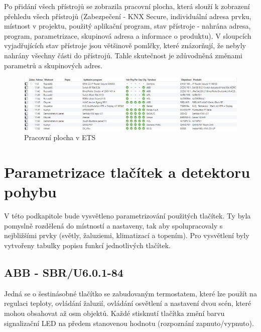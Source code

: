 Po přidání všech přístrojů se zobrazila pracovní plocha, která slouží k zobrazení přehledu všech přístrojů (Zabezpečení - KNX Secure, individuální adresa prvku, místnost v projektu, použitý aplikační program, stav přístroje - nahrána adresa, program, parametrizace, skupinová adresa a informace o produktu). V sloupcích vyjadřujících stav přístroje jsou většinově pomlčky, které znázorňují, že nebyly nahrány všechny části do přístrojů. Tahle skutečnost je zdůvodněná změnami parametrů a skupinových adres.

\begin{figure}[!ht]
  \begin{center}
    \includegraphics[scale=0.5]{obrazky/Přístroje v ETS.png}
  \end{center}
  \caption[Pracovní plocha v ETS]{Pracovní plocha v ETS}
  \label{fig:Pracovní plocha v ETS}
\end{figure}

\section{Parametrizace tlačítek a detektoru pohybu}
V této podkapitole bude vysvětleno parametrizování použitých tlačítek. Ty byla pomyslně rozdělená do místností a nastaveny, tak aby spolupracovaly s nejbližšími prvky (světly, žaluziemi, klimatizací a topením). Pro vysvětlení byly vytvořeny tabulky popisu funkcí jednotlivých tlačítek. 

\subsection{ABB - SBR/U6.0.1-84}
Jedná se o šestinásobné tlačítko se zabudovaným termostatem, které lze použít na regulaci teploty, ovládání žaluzií, ovládání osvětlení a nastavení dvou scén, které mohou obsahovat až osm objektů. Každé stisknutí tlačítka změní barvu signalizační LED na předem stanovenou hodnotu (rozpoznání zapnuto/vypnuto). \cite{ABB}

